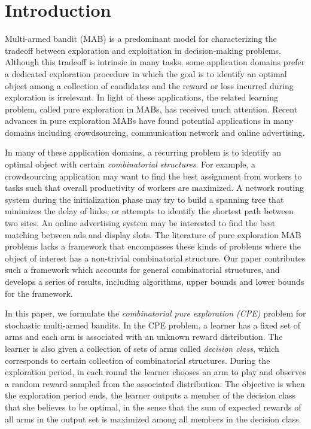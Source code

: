 \documentclass{article}
\newcommand{\Problem}{{CPE}\xspace}
\begin{document}
\vspace{-0.3em}
\section{Introduction}
\vspace{-0.3em}
Multi-armed bandit (MAB) is a predominant model for characterizing the tradeoff between exploration and exploitation in decision-making problems. 
Although this tradeoff is intrinsic in many tasks, some application domains prefer a dedicated exploration procedure in which the goal is to identify an optimal object among a collection of candidates and the reward or loss incurred during exploration is irrelevant.
In light of these applications, the related learning problem, called pure exploration in MABs, has received much attention.
Recent advances in pure exploration MABs have found potential applications in many domains including crowdsourcing, communication network and online advertising.

In many  of these application domains, a recurring problem is to identify an optimal object with certain \emph{combinatorial structures}. 
For example, a crowdsourcing application may want to find the best assignment from workers to tasks such that overall productivity of workers are maximized. 
A network routing system during the initialization phase may try to build a spanning tree that minimizes the delay of links, or attempts to identify the shortest path between two sites.  
An online advertising system may be interested to find the best matching between ads and display slots. 
The literature of pure exploration MAB problems lacks a framework that encompasses these kinds of problems where the object of interest has a non-trivial combinatorial structure.  
Our paper contributes such a framework which accounts for general combinatorial structures, and develops a series of results, including algorithms, upper bounds and lower bounds for the framework.

In this paper, we formulate the {\em combinatorial pure exploration (\Problem)} problem for stochastic multi-armed bandits.  
In the \Problem problem, a learner has a fixed set of arms and each arm is associated with an unknown reward distribution. 
The learner is also given a collection of sets of arms called \emph{decision class}, which
	corresponds to  certain collection of combinatorial structures.
During the exploration period, in each round the learner chooses an arm to play
	and observes a random reward sampled from the associated distribution. 
The objective is when the exploration period ends, the learner outputs a member of the decision
	class that she believes to be optimal, in the sense that the sum of expected rewards of all arms
	in the output set is maximized among all members in the decision class.
\end{document}
